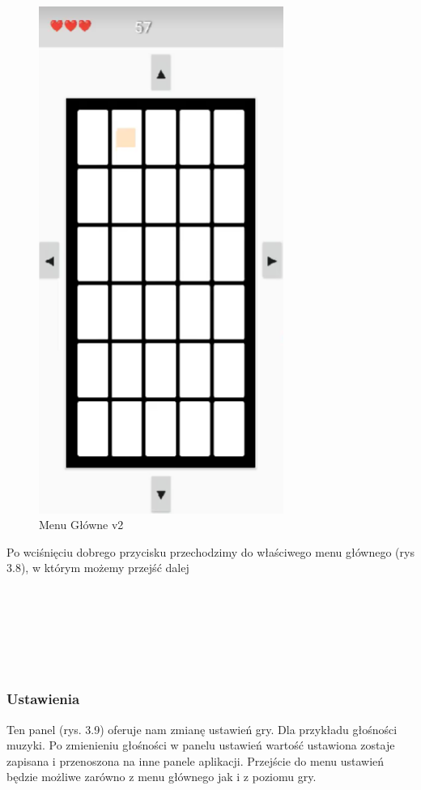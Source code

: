	\begin{figure}[!htb]
	\begin{center}
		\includegraphics[width=8cm]{rys/menu12.png}
		\caption{Menu Główne v2}
		\label{rys:rysunek001}
	\end{center}
\end{figure}

Po wciśnięciu dobrego przycisku przechodzimy do właściwego menu głównego (rys 3.8), w którym możemy przejść dalej 
\\
\\
\\
\\
\\
\\
\\

\subsubsection{Ustawienia}
\hspace*{0.60cm}Ten panel (rys. 3.9) oferuje nam zmianę ustawień gry. Dla przykładu głośności muzyki. Po zmienieniu głośności w panelu ustawień wartość ustawiona zostaje zapisana i przenoszona na inne panele aplikacji. Przejście do menu ustawień będzie możliwe zarówno z menu głównego jak i z poziomu gry.
	
